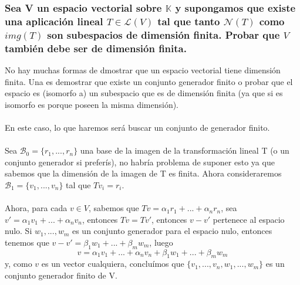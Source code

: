 \documentclass{article}
\begin{document}
\subsubsection{Sea V un espacio vectorial sobre $\mathbb{K}$ y supongamos que existe una aplicación
lineal $T \in \mathcal{L}(V)$ tal que tanto $\mathcal{N}(T)$ como $img(T)$ son subespacios de dimensión
finita. Probar que $V$ también debe ser de dimensión finita.}
No hay muchas formas de dmostrar que un espacio vectorial tiene dimensión finita. 
Una es demostrar que existe un conjunto generador finito o probar que el espacio es (isomorfo a) 
un subespacio que es de dimensión finita (ya que si es isomorfo es porque poseen la misma dimensión).
\\
\\ En este caso, lo que haremos será buscar un conjunto de generador finito.
\\
\\ Sea $\mathcal{B}_0 = \{ r_1,...,r_n \}$ una base de la imagen de la transformación lineal T
 (o un conjunto generador si preferís), no habría problema de suponer esto ya que sabemos que la dimensión de la
imagen de T es finita.
Ahora consideraremos $\mathcal{B}_1 = \{ v_1,...,v_n \} $ tal que $Tv_i=r_i$. \\
\\ Ahora, para cada $v \in V$, sabemos que $Tv = \alpha_1r_1+...+\alpha_nr_n$, sea
$v' = \alpha_1v_1+...+\alpha_nv_n$, entonces $Tv = Tv'$, entonces $v-v'$ pertenece al espacio nulo.
Si $w_1,...,w_m$ es un conjunto generador para el espacio nulo, entonces tenemos que
$v-v' = \beta_1w_1+...+\beta_mw_m$, luego
\[
v = \alpha_1v_1+...+\alpha_nv_n+\beta_1w_1+...+\beta_mw_m
\]
y, como $v$ es un vector cualquiera, concluímos que $\{ v_1,...,v_n,w_1,...,w_m\}$ es un conjunto generador
finito de V.
\end{document}

